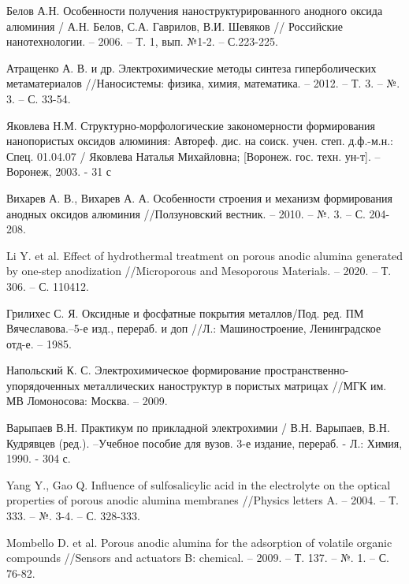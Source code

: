 \begingroup
\renewcommand{\section}[2]{\anonsection{Библиографический список}}
\begin{thebibliography}{00}

Белов А.Н. Особенности получения наноструктурированного анодного оксида алюминия / А.Н. Белов, С.А. Гаврилов, В.И. Шевяков // Российские нанотехнологии. – 2006. – Т. 1, вып. №1-2. – С.223-225.

Атращенко А. В. и др. Электрохимические методы синтеза гиперболических метаматериалов //Наносистемы: физика, химия, математика. – 2012. – Т. 3. – №. 3. – С. 33-54.

Яковлева Н.М. Структурно-морфологические закономерности формирования нанопористых оксидов алюминия: Автореф. дис. на соиск. учен. степ. д.ф.-м.н.: Спец. 01.04.07 / Яковлева Наталья Михайловна; [Воронеж. гос. техн. ун-т]. – Воронеж, 2003. - 31 с

Вихарев А. В., Вихарев А. А. Особенности строения и механизм формирования анодных оксидов алюминия //Ползуновский вестник. – 2010. – №. 3. – С. 204-208.

Li Y. et al. Effect of hydrothermal treatment on porous anodic alumina generated by one-step anodization //Microporous and Mesoporous Materials. – 2020. – Т. 306. – С. 110412.

Грилихес С. Я. Оксидные и фосфатные покрытия металлов/Под. ред. ПМ Вячеславова.–5-е изд., перераб. и доп //Л.: Машиностроение, Ленинградское отд-е. – 1985.

Напольский К. С. Электрохимическое формирование пространственно-упорядоченных металлических наноструктур в пористых матрицах //МГК им. МВ Ломоносова: Москва. – 2009.

Варыпаев В.Н. Практикум по прикладной электрохимии / В.Н. Варыпаев, В.Н. Кудрявцев (ред.). –Учебное пособие для вузов. 3-е издание, перераб. - Л.: Химия, 1990. - 304 с.

Yang Y., Gao Q. Influence of sulfosalicylic acid in the electrolyte on the optical properties of porous anodic alumina membranes //Physics letters A. – 2004. – Т. 333. – №. 3-4. – С. 328-333.

Mombello D. et al. Porous anodic alumina for the adsorption of volatile organic compounds //Sensors and actuators B: chemical. – 2009. – Т. 137. – №. 1. – С. 76-82.


\end{thebibliography}
